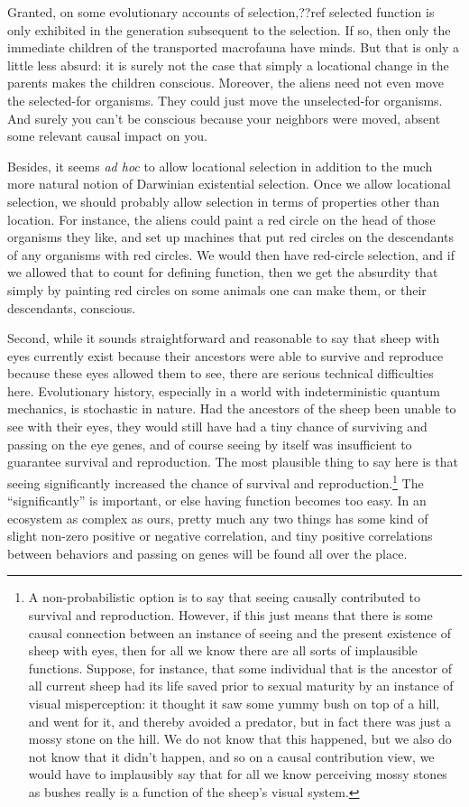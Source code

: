Granted, on some evolutionary accounts of selection,??ref selected function is only exhibited in the generation
subsequent to the selection. If so, then only the immediate children of the transported macrofauna have minds.
But that is only a little less absurd: it is surely not the case that simply a locational change in the parents
makes the children conscious. Moreover, the aliens need not even move the selected-for organisms. They could just
move the unselected-for organisms. And surely you can't be conscious because your neighbors were
moved, absent some relevant causal impact on you.

Besides, it seems \textit{ad hoc} to allow locational selection in addition to the much more natural notion of 
Darwinian existential selection. Once we allow locational selection, we should probably allow selection in terms 
of properties other than location. For instance, the aliens could paint a red circle on the head of those organisms
they like, and set up machines that put red circles on the descendants of any organisms with red circles. We would
then have red-circle selection, and if we allowed that to count for defining function, then we get the absurdity
that simply by painting red circles on some animals one can make them, or their descendants, conscious. 

Second, while it sounds straightforward and reasonable to say that sheep with eyes currently exist because their 
ancestors were able to survive and reproduce because these eyes allowed them to see, there are 
serious technical difficulties here. Evolutionary history, especially in a world with indeterministic quantum
mechanics, is stochastic in nature. Had the ancestors of the sheep been unable to see with their eyes, they would 
still have had a tiny chance of surviving and passing on the eye genes, and of course seeing by itself was insufficient 
to guarantee survival and reproduction. The most plausible thing to say here is that seeing significantly increased the chance of 
survival and reproduction.\footnote{A non-probabilistic option is to say that seeing causally contributed to survival and 
reproduction. However, if this just means that there is some causal connection between an instance of seeing and the 
present existence of sheep with eyes, then for all we know there are all sorts of implausible functions. Suppose, for
instance, that some individual that is the ancestor of all current sheep had its life saved prior to sexual maturity  
by an instance of visual misperception: it thought it saw some yummy bush on top of a hill, and went for it, 
and thereby avoided a predator, but in fact there was just a mossy stone on the hill. We do not know that this happened,
but we also do not know that it didn't happen, and so on a causal contribution view, we would have to implausibly say that for all
we know perceiving mossy stones as bushes really is a function of the sheep's visual system.} The ``significantly'' is important, or else having function becomes too easy. In an ecosystem as complex 
as ours, pretty much any two things has some kind of slight non-zero positive or negative correlation, and tiny positive 
correlations between behaviors and passing on genes will be found all over the place. 

